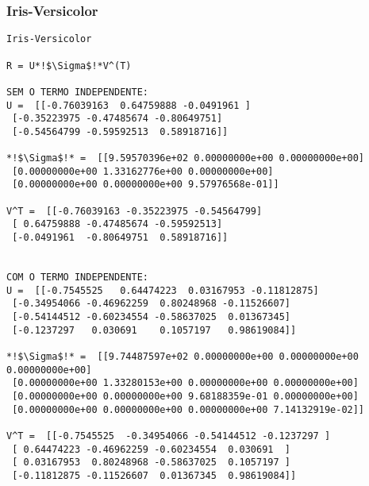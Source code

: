 \documentclass[a4paper,12pt,twoside]{article}
\begin{document}
\subsubsection{Iris-Versicolor}
\begin{lstlisting}
Iris-Versicolor

R = U*!$\Sigma$!*V^(T)

SEM O TERMO INDEPENDENTE: 
U =  [[-0.76039163  0.64759888 -0.0491961 ]
 [-0.35223975 -0.47485674 -0.80649751]
 [-0.54564799 -0.59592513  0.58918716]]

*!$\Sigma$!* =  [[9.59570396e+02 0.00000000e+00 0.00000000e+00]
 [0.00000000e+00 1.33162776e+00 0.00000000e+00]
 [0.00000000e+00 0.00000000e+00 9.57976568e-01]]

V^T =  [[-0.76039163 -0.35223975 -0.54564799]
 [ 0.64759888 -0.47485674 -0.59592513]
 [-0.0491961  -0.80649751  0.58918716]]


COM O TERMO INDEPENDENTE: 
U =  [[-0.7545525   0.64474223  0.03167953 -0.11812875]
 [-0.34954066 -0.46962259  0.80248968 -0.11526607]
 [-0.54144512 -0.60234554 -0.58637025  0.01367345]
 [-0.1237297   0.030691    0.1057197   0.98619084]]

*!$\Sigma$!* =  [[9.74487597e+02 0.00000000e+00 0.00000000e+00 0.00000000e+00]
 [0.00000000e+00 1.33280153e+00 0.00000000e+00 0.00000000e+00]
 [0.00000000e+00 0.00000000e+00 9.68188359e-01 0.00000000e+00]
 [0.00000000e+00 0.00000000e+00 0.00000000e+00 7.14132919e-02]]

V^T =  [[-0.7545525  -0.34954066 -0.54144512 -0.1237297 ]
 [ 0.64474223 -0.46962259 -0.60234554  0.030691  ]
 [ 0.03167953  0.80248968 -0.58637025  0.1057197 ]
 [-0.11812875 -0.11526607  0.01367345  0.98619084]]
\end{lstlisting}
\end{document}
